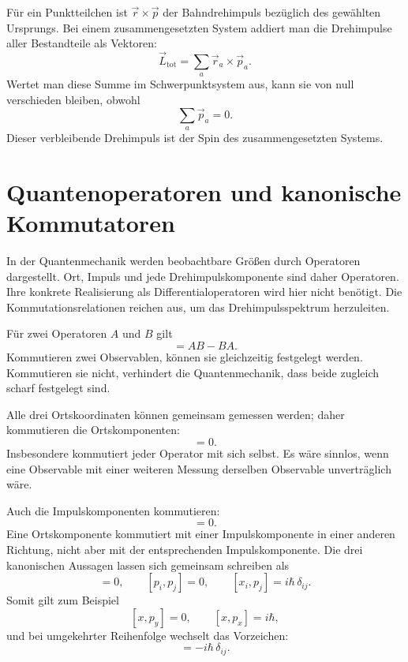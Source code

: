 Für ein Punktteilchen ist \(\vec r\times\vec p\) der Bahndrehimpuls bezüglich des gewählten Ursprungs. Bei einem zusammengesetzten System addiert man die Drehimpulse aller Bestandteile als Vektoren:
\begin{equation}
\vec L_{\mathrm{tot}}=\sum_a \vec r_a\times\vec p_a.
\end{equation}
Wertet man diese Summe im Schwerpunktsystem aus, kann sie von null verschieden bleiben, obwohl
\[
\sum_a\vec p_a=0.
\]
Dieser verbleibende Drehimpuls ist der Spin des zusammengesetzten Systems.

\section{Quantenoperatoren und kanonische Kommutatoren}

In der Quantenmechanik werden beobachtbare Größen durch Operatoren dargestellt. Ort, Impuls und jede Drehimpulskomponente sind daher Operatoren. Ihre konkrete Realisierung als Differentialoperatoren wird hier nicht benötigt. Die Kommutationsrelationen reichen aus, um das Drehimpulsspektrum herzuleiten.

Für zwei Operatoren \(A\) und \(B\) gilt
\begin{equation}
[A,B]=AB-BA.
\end{equation}
Kommutieren zwei Observablen, können sie gleichzeitig festgelegt werden. Kommutieren sie nicht, verhindert die Quantenmechanik, dass beide zugleich scharf festgelegt sind.

Alle drei Ortskoordinaten können gemeinsam gemessen werden; daher kommutieren die Ortskomponenten:
\begin{equation}
[x_i,x_j]=0.
\end{equation}
Insbesondere kommutiert jeder Operator mit sich selbst. Es wäre sinnlos, wenn eine Observable mit einer weiteren Messung derselben Observable unverträglich wäre.

Auch die Impulskomponenten kommutieren:
\begin{equation}
[p_i,p_j]=0.
\end{equation}
Eine Ortskomponente kommutiert mit einer Impulskomponente in einer anderen Richtung, nicht aber mit der entsprechenden Impulskomponente. Die drei kanonischen Aussagen lassen sich gemeinsam schreiben als
\begin{equation}
[x_i,x_j]=0,\qquad
[p_i,p_j]=0,\qquad
[x_i,p_j]=i\hbar\,\delta_{ij}.
\end{equation}
Somit gilt zum Beispiel
\[
[x,p_y]=0,\qquad [x,p_x]=i\hbar,
\]
und bei umgekehrter Reihenfolge wechselt das Vorzeichen:
\begin{equation}
[p_j,x_i]=-i\hbar\,\delta_{ij}.
\end{equation}

